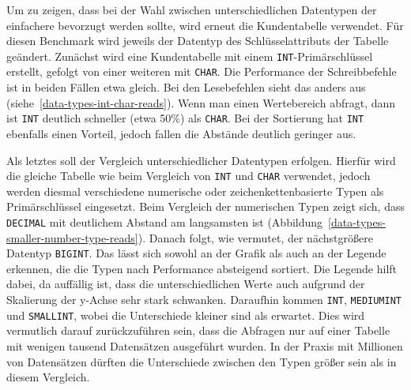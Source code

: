 Um zu zeigen, dass bei der Wahl zwischen unterschiedlichen Datentypen der einfachere bevorzugt werden sollte, wird erneut die Kundentabelle verwendet.
Für diesen Benchmark wird jeweils der Datentyp des Schlüsselattributs der Tabelle geändert.
Zunächst wird eine Kundentabelle mit einem \texttt{INT}-Primärschlüssel erstellt, gefolgt von einer weiteren mit \texttt{CHAR}.
Die Performance der Schreibbefehle ist in beiden Fällen etwa gleich.
Bei den Lesebefehlen sieht das anders aus (siehe~\ref{data-types-int-char-reads}).
Wenn man einen Wertebereich abfragt, dann ist \texttt{INT} deutlich schneller (etwa 50\%) als \texttt{CHAR}.
Bei der Sortierung hat \texttt{INT} ebenfalls einen Vorteil, jedoch fallen die Abstände deutlich geringer aus.

Als letztes soll der Vergleich unterschiedlicher Datentypen erfolgen.
Hierfür wird die gleiche Tabelle wie beim Vergleich von \texttt{INT} und \texttt{CHAR} verwendet, jedoch werden diesmal verschiedene numerische oder zeichenkettenbasierte Typen als Primärschlüssel eingesetzt.
Beim Vergleich der numerischen Typen zeigt sich, dass \texttt{DECIMAL} mit deutlichem Abstand am langsamsten ist (Abbildung~\ref{data-types-smaller-number-type-reads}).
Danach folgt, wie vermutet, der nächstgrößere Datentyp \texttt{BIGINT}.
Das lässt sich sowohl an der Grafik als auch an der Legende erkennen, die die Typen nach Performance absteigend sortiert.
Die Legende hilft dabei, da auffällig ist, dass die unterschiedlichen Werte auch aufgrund der Skalierung der y-Achse sehr stark schwanken.
Daraufhin kommen \texttt{INT}, \texttt{MEDIUMINT} und \texttt{SMALLINT}, wobei die Unterschiede kleiner sind als erwartet.
Dies wird vermutlich darauf zurückzuführen sein, dass die Abfragen nur auf einer Tabelle mit wenigen tausend Datensätzen ausgeführt wurden.
In der Praxis mit Millionen von Datensätzen dürften die Unterschiede zwischen den Typen größer sein als in diesem Vergleich.

